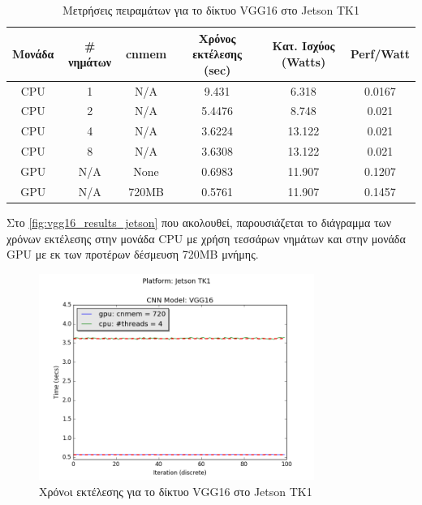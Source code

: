 \begin{table}[H]
  \begin{center}
    \caption{Μετρήσεις πειραμάτων για το δίκτυο VGG16 στο Jetson TK1}
    \label{tab:vgg16_jetson}
    \small
    \begin{tabular}[center]{ | c | c | c | c | c | c | }
      \hline
      \rowcolor{Gray}
      Μονάδα & \# νημάτων & cnmem & Χρόνος εκτέλεσης (sec) & Κατ. Ισχύος (Watts) & Perf/Watt \\
      \hline
      CPU & 1 & N/A & 9.431 & 6.318 & 0.0167\\
      CPU & 2 & N/A & 5.4476 &  8.748 & 0.021\\
      CPU & 4 & N/A & 3.6224 & 13.122 & 0.021\\
      CPU & 8 & N/A & 3.6308 & 13.122 & 0.021\\
      GPU & N/A & None & 0.6983 & 11.907 & 0.1207\\
      GPU & N/A & 720MB & 0.5761 & 11.907 & 0.1457\\
      \hline
    \end{tabular}
  \end{center}
\end{table}

Στο \autoref{fig:vgg16_results_jetson} που ακολουθεί, παρουσιάζεται το διάγραμμα
των χρόνων εκτέλεσης στην μονάδα CPU με χρήση τεσσάρων νημάτων και στην μονάδα
GPU με εκ των προτέρων δέσμευση 720MB μνήμης.


\begin{figure}[H]
  \centering
  \includegraphics[width=0.8\textwidth]{./images/chapter6/benchmark_vgg16_jetson.png}
  \caption[Χρόνoι εκτέλεσης για το δίκτυο VGG16 στο Jetson TK1]{Χρόνoι εκτέλεσης για το δίκτυο VGG16 στο Jetson TK1}
  \label{fig:vgg16_results_jetson}
\end{figure}


